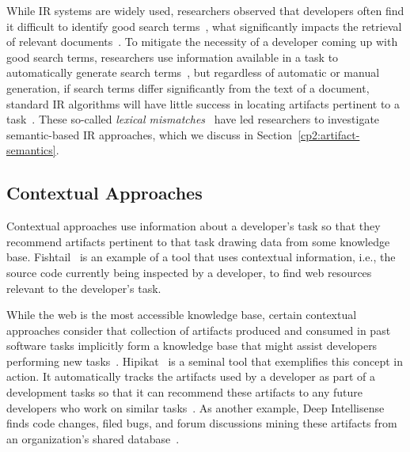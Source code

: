 While IR systems are widely used, researchers 
observed that developers often find it difficult to identify good search terms~\cite{Kevic2014, Huang2018},
what significantly impacts the retrieval of relevant documents~\cite{Kevic2014, mills2017}.
To mitigate  the necessity of a developer coming up with good search terms,
researchers use information available in a task to automatically generate search terms~\cite{Kevic2014, Haiduc2013}, but regardless of automatic or manual generation, if search terms 
differ significantly from the text of a document,
standard \acs{IR} algorithms will have 
little success in locating artifacts pertinent to a task~\cite{Huang2018}.
These so-called \textit{lexical mismatches}~\cite{Ye2016, silva2019} have led researchers to investigate 
 semantic-based \acs{IR} approaches, which we discuss in 
Section~\ref{cp2:artifact-semantics}.




% 


\subsection{Contextual Approaches} 


Contextual approaches use information 
about a developer's task so that 
they recommend artifacts pertinent to that task drawing data from some knowledge base.
Fishtail~\cite{Sawadsky2011}
is an example of a tool that uses contextual information, i.e., the source code currently being inspected by a developer, to find web resources relevant to the developer's task.



While the web is the most accessible knowledge base, certain contextual approaches consider that 
collection of artifacts produced and consumed in past software tasks 
 implicitly
form a knowledge base that might assist developers performing new tasks~\cite{Cubranic2005}. 
Hipikat~\cite{Cubranic2005} is a seminal tool that exemplifies this concept in action.
It automatically tracks the artifacts 
used by a developer as part of a development tasks
so that it can recommend these artifacts to 
any future developers who work on similar tasks~\cite{Cubranic2005}.
As another example, Deep Intellisense
finds code changes, filed bugs, and forum discussions 
mining these artifacts from an organization's shared database~\cite{Holmes2008}.










